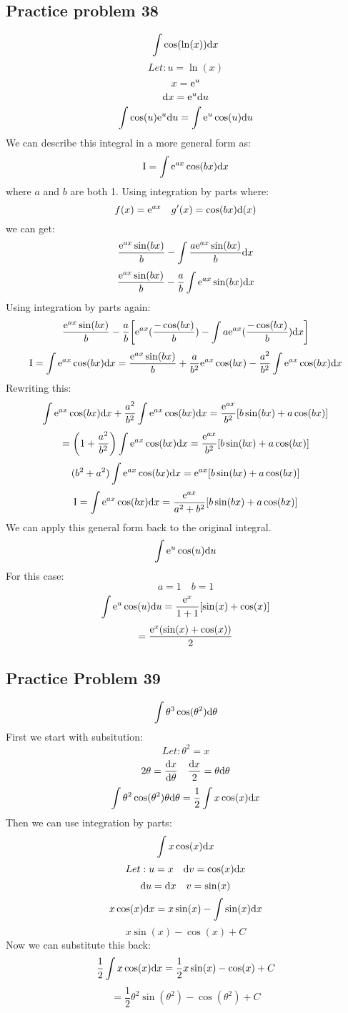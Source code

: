 \documentclass[letterpaper, 12pt]{math}
\begin{document}
\subsection*{Practice problem 38}
\[ \int{\cos(\ln(x))\mathrm{d}{x}} \]
\[ Let: u = \ln(x) \]
\[ x = \mathrm{e}^{u} \]
\[ \mathrm{d}{x} = \mathrm{e}^{u}\mathrm{d}{u} \]
\[ \int{\cos(u)\mathrm{e}^{u}\mathrm{d}{u}} = \int{\mathrm{e}^{u}\cos(u)\mathrm{d}{u}} \]
We can describe this integral in a more general form as:
\[ \mathrm{I} = \int{\mathrm{e}^{ax}\cos(bx)\mathrm{d}{x}} \]
where \( a \) and \( b \) are both 1. Using integration by parts where:
\[ f(x) = \mathrm{e}^{ax} \quad g'(x) = \cos(bx)\mathrm{d}(x) \]
we can get:
\[ \frac{\mathrm{e}^{ax}\sin(bx)}{b}-\int{\frac{a\mathrm{e}^{ax}\sin(bx)}{b}\mathrm{d}{x}} \]
\[ \frac{\mathrm{e}^{ax}\sin(bx)}{b}-\frac{a}{b}\int{\mathrm{e}^{ax}\sin(bx)\mathrm{d}{x}} \]
Using integration by parts again:
\[ \frac{\mathrm{e}^{ax}\sin(bx)}{b}-\frac{a}{b}\bigg[\mathrm{e}^{ax}(\frac{-\cos(bx)}{b})-
   \int{a\mathrm{e}^{ax}(\frac{-\cos(bx)}{b})\mathrm{d}{x}}\bigg] \]
\[ \mathrm{I} = \int{\mathrm{e}^{ax}\cos(bx)\mathrm{d}{x}} =
   \frac{\mathrm{e}^{ax}\sin(bx)}{b}+\frac{a}{b^{2}}\mathrm{e}^{ax}\cos(bx)-\frac{a^{2}}{b^{2}}
   \int{\mathrm{e}^{ax}\cos(bx)\mathrm{d}{x}} \]
Rewriting this:
\[ \int{\mathrm{e}^{ax}\cos(bx)\mathrm{d}{x}}+
   \frac{a^{2}}{b^{2}}\int{\mathrm{e}^{ax}\cos(bx)\mathrm{d}{x}} =
   \frac{\mathrm{e}^{ax}}{b^{2}}[b\sin(bx)+a\cos(bx)] \]
\[ = \bigg(1+\frac{a^{2}}{b^{2}}\bigg)\int{\mathrm{e}^{ax}\cos(bx)\mathrm{d}{x}} =
   \frac{\mathrm{e}^{ax}}{b^{2}}[b\sin(bx)+a\cos(bx)] \]
\[ (b^{2}+a^{2})\int{\mathrm{e}^{ax}\cos(bx)\mathrm{d}{x}} = \mathrm{e}^{ax}[b\sin(bx)+a\cos(bx)] \]
\[ \mathrm{I} = \int{\mathrm{e}^{ax}\cos(bx)\mathrm{d}{x}} =
   \frac{\mathrm{e}^{ax}}{a^{2}+b^{2}}[b\sin(bx)+a\cos(bx)] \]
We can apply this general form back to the original integral.
\[ \int{\mathrm{e}^{u}\cos(u)\mathrm{d}{u}} \]
For this case:
\[ a = 1 \quad b = 1 \]
\[ \int{\mathrm{e}^{u}\cos(u)\mathrm{d}{u}} = \frac{\mathrm{e}^{x}}{1+1}[\sin(x)+\cos(x)] \]
\[ = \frac{\mathrm{e}^{x}(\sin(x)+\cos(x))}{2} \]

\subsection*{Practice Problem 39}
\[ \int{\theta^{3}\cos(\theta^{2})\mathrm{d}{\theta}} \]
First we start with subsitution:
\[ Let: \theta^{2} = x \]
\[ 2\theta = \frac{\mathrm{d}{x}}{\mathrm{d}{\theta}} \quad
   \frac{\mathrm{d}{x}}{2} = \theta\mathrm{d}{\theta} \]
\[ \int{\theta^{2}\cos(\theta^{2})\theta\mathrm{d}{\theta}} =
   \frac{1}{2}\int{x\cos(x)\mathrm{d}{x}} \]
Then we can use integration by parts:
\[ \int{x\cos(x)\mathrm{d}{x}} \]
\[ Let: u = x \quad \mathrm{d}{v} = \cos(x)\mathrm{d}{x} \]
\[ \mathrm{d}{u} = \mathrm{d}{x} \quad v = \sin(x) \]
\[ x\cos(x)\mathrm{d}{x} = x\sin(x)-\int{\sin(x)\mathrm{d}{x}} \]
\[ x\sin(x)-\cos(x)+C \]
Now we can substitute this back:
\[ \frac{1}{2}\int{x\cos(x)\mathrm{d}{x}} = \frac{1}{2}x\sin(x)-\cos(x)+C \]
\[ = \frac{1}{2}\theta^{2}\sin(\theta^{2})-\cos(\theta^{2})+C \]
\end{document}

